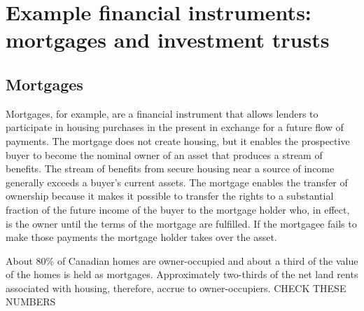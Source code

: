 \section{Example financial instruments: mortgages and investment trusts}

\subsection{Mortgages}

Mortgages, for example, are a financial instrument that allows lenders to  participate in housing purchases in the present in exchange for a future flow of payments.  The mortgage does not create housing, but it enables the prospective buyer to become the nominal owner of an asset that produces a stream of benefits. The stream of benefits from secure housing near a source of income generally exceeds a buyer's current assets. The mortgage enables the  transfer of ownership because it makes it possible to transfer the rights to a substantial fraction of the future income of the buyer to the mortgage holder who, in effect, is the owner until the terms of the mortgage are fulfilled.  If the mortgagee fails to make those payments the mortgage holder takes over the asset. 

About 80\% of Canadian homes are owner-occupied and about a third of the value of the homes is held as mortgages. Approximately two-thirds of the net land rents associated with housing, therefore, accrue to owner-occupiers. {\color {red}CHECK THESE NUMBERS } 


\begin{center}
\end{center}

